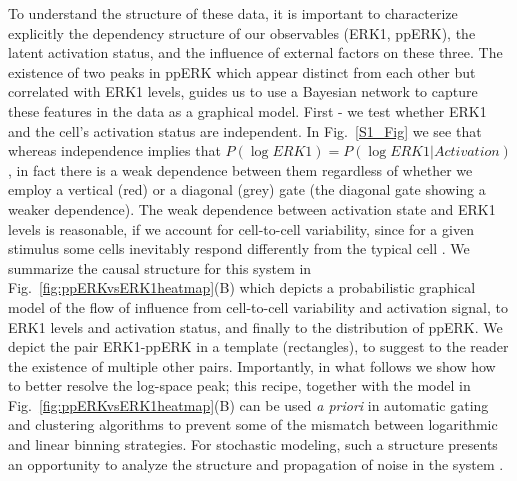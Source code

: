 \documentclass[11pt,a4paper,draft]{article}
\begin{document}
To understand the structure of these data, it is important to characterize explicitly the dependency structure of our observables (ERK1, ppERK), the latent activation status, and the influence of external factors on these three. The existence of two peaks in ppERK which appear distinct from each other but correlated with ERK1 levels, guides us to use a Bayesian network to capture these features in the data as a graphical model. First - we test whether ERK1 and the cell's activation status are independent. In Fig.~\ref{S1_Fig} we see that whereas independence implies that $P(\log ERK1) = P(\log ERK1 \vert Activation)$, in fact there is a weak dependence between them regardless of whether we employ a vertical (red) or a diagonal (grey) gate (the diagonal gate showing a weaker dependence). The weak dependence between activation state and ERK1 levels is reasonable, if we account for cell-to-cell variability, since for a given stimulus some cells inevitably respond differently from the typical cell \cite{Spencer2009}. We summarize the causal structure for this system in Fig.~\ref{fig:ppERKvsERK1heatmap}(B) which depicts a probabilistic graphical model \cite{Koller2009} of the flow of influence from cell-to-cell variability and activation signal, to ERK1 levels and activation status, and finally to the distribution of ppERK. We depict the pair ERK1-ppERK in a template (rectangles), to suggest to the reader the existence of multiple other pairs. Importantly, in what follows we show how to better resolve the log-space peak; this recipe, together with the model in Fig.~\ref{fig:ppERKvsERK1heatmap}(B) can be used \emph{a priori} in automatic gating and clustering algorithms to prevent some of the mismatch between logarithmic and linear binning strategies. For stochastic modeling, such a structure presents an opportunity to analyze the structure and propagation of noise in the system \cite{Prill2015,Ching2017}.
\smallskip
\end{document}

